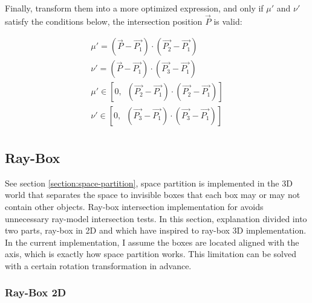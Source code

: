 Finally, transform them into a more optimized expression, and only if $\mu'$ and $\nu'$ satisfy the conditions below, the intersection position $\overrightarrow{P}$ is valid:

\[
\begin{array}{lr}
\mu' = (\overrightarrow{P} - \overrightarrow{P_1}) \cdot (\overrightarrow{P_2} - \overrightarrow{P_1})\\
\nu' = (\overrightarrow{P} - \overrightarrow{P_1}) \cdot (\overrightarrow{P_3} - \overrightarrow{P_1})\\
\mu' \in [0,\enspace (\overrightarrow{P_2} - \overrightarrow{P_1}) \cdot (\overrightarrow{P_2} - \overrightarrow{P_1})]\\
\nu' \in [0,\enspace (\overrightarrow{P_3} - \overrightarrow{P_1}) \cdot (\overrightarrow{P_3} - \overrightarrow{P_1})]\\
\end{array}
\]

\subsection{Ray-Box}
\label{section:ray-box}

See section \ref{section:space-partition}, space partition is implemented in the 3D world that separates the space to invisible boxes that each box may or may not contain other objects. Ray-box intersection implementation for avoids unnecessary ray-model intersection tests. In this section, explanation divided into two parts, ray-box in 2D and which have inspired to ray-box 3D implementation. In the current implementation, I assume the boxes are located aligned with the axis, which is exactly how space partition works. This limitation can be solved with a certain rotation transformation in advance.

\subsubsection{Ray-Box 2D}

